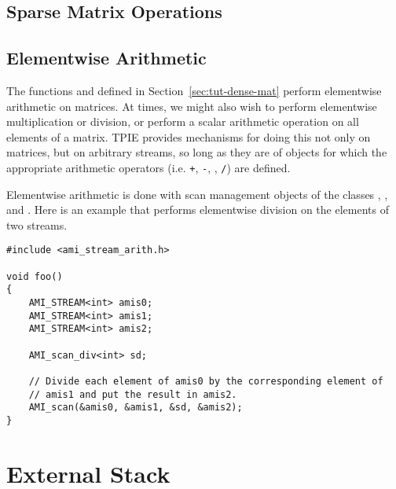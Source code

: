 
\subsection{Sparse Matrix Operations}


\tobewritten


\subsection{Elementwise Arithmetic}

The functions 
and  defined in
Section~\ref{sec:tut-dense-mat} perform elementwise arithmetic on
matrices.  At times, we might also wish to perform elementwise
multiplication or division, or perform a scalar arithmetic operation
on all elements of a matrix.  TPIE provides mechanisms for doing this
not only on matrices, but on arbitrary streams, so long as they are of
objects for which the appropriate arithmetic operators (i.e. {\tt +},
{\tt -}, {\tt *}, {\tt /}) are defined.

Elementwise arithmetic is done with scan management objects
 of the classes
, ,  and
.  Here is an example that performs
elementwise division on the elements of two streams.

\begin{verbatim}
#include <ami_stream_arith.h>

void foo()
{
    AMI_STREAM<int> amis0;
    AMI_STREAM<int> amis1;
    AMI_STREAM<int> amis2;

    AMI_scan_div<int> sd;

    // Divide each element of amis0 by the corresponding element of
    // amis1 and put the result in amis2.
    AMI_scan(&amis0, &amis1, &sd, &amis2);
}
\end{verbatim}



\section{External Stack}

